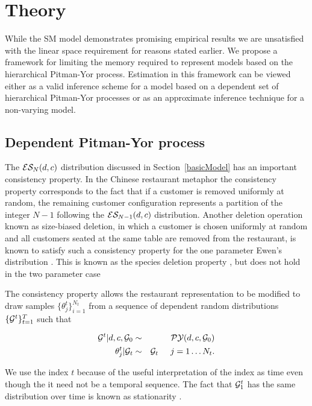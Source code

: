 \section{Theory}

While the SM model demonstrates promising empirical results \cite{Gasthaus} we are unsatisfied with the linear space requirement for reasons stated earlier.  We propose a framework for limiting the memory required to represent models based on the hierarchical Pitman-Yor process.  Estimation in this framework can be viewed either as a valid inference scheme for a model based on a dependent set of hierarchical Pitman-Yor processes or as an approximate inference technique for a non-varying model.

\subsection{Dependent Pitman-Yor process} 

The $\ES_N(d,c)$ distribution discussed in Section~\ref{basicModel} has an important consistency property. In the Chinese restaurant metaphor the consistency property corresponds to the fact that if a customer is removed uniformly at random, the remaining customer configuration represents a partition of the integer $N-1$ following the $\ES_{N-1}(d,c)$ distribution. Another deletion operation known as size-biased deletion, in which a customer is chosen uniformly at random and all customers seated at the same table are removed from the restaurant, is known to satisfy such a consistency property for the one parameter Ewen's distribution \cite{kingman}.  This is known as the species deletion property \cite{kingman}, but does not hold in the two parameter case \cite{pitman}

The consistency property allows the restaurant representation to be modified to draw samples  $\{ \theta_j^t \}_{i = 1}^{N_t}$ from a sequence of dependent random distributions $\{ \G^t \}_{t=1}^T$ such that 

\begin{eqnarray}
 \label{eqnDependentPY1}  \G^t | d, c, \G_0 &\sim& \PY(d,c,\G_0)\\
 \label{eqnDependentPY2}  \theta_j^t | \G_t &\sim& \G_t \hspace{.5cm} j = 1 \dots N_t.
 \end{eqnarray}
 
We use the index $t$ because of the useful interpretation of the index as time even though the it need not be a temporal sequence. The fact that $\G^t_1$ has the same distribution over time is known as stationarity \cite{davis and brockwel}.  
 
